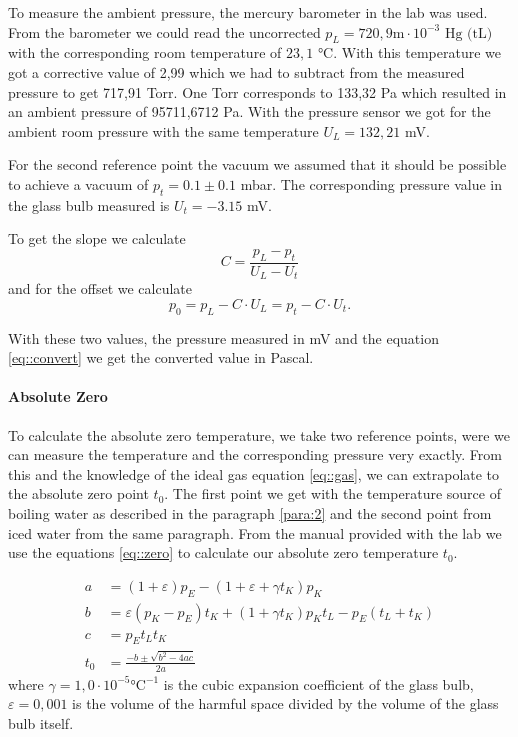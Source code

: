 To measure the ambient pressure, the mercury barometer in the lab was used.
From the barometer we could read the uncorrected $p_L = 720,9$$\si{\m} \cdot 10^{-3} \text{  Hg (tL)}$ with the corresponding room temperature of $23,1$ $\si{\degreeCelsius}$. 
With this temperature we got a corrective value of 2,99 which we had to subtract from the measured pressure to get 717,91 Torr.
One Torr corresponds to 133,32 Pa which resulted in an ambient pressure of 95711,6712 Pa.
With the pressure sensor we got for the ambient room pressure with the same temperature $U_L = 132,21$ \si{\milli\volt}.


For the second reference point the vacuum we assumed that it should be possible to achieve a vacuum of $p_t = 0.1\pm 0.1$ mbar. 
The corresponding pressure value in the glass bulb measured is $ U_t = -3.15$ \si{\milli\volt}.


To get the slope we calculate
\[
C= \frac{p_L -p_t}{U_L -U_t}
\]
and for the offset we calculate
\[
p_0= p_L-C\cdot U_L = p_t-C\cdot U_t.
\]

With these two values, the pressure measured in \si{\milli\volt} and the equation \ref{eq::convert} we get the converted value in Pascal.


\paragraph{Absolute Zero} To calculate the absolute zero temperature, we take two reference points, were we can measure the temperature and the corresponding pressure very exactly. 
From this and the knowledge of the ideal gas equation \ref{eq::gas}, we can extrapolate to the absolute zero point $t_0$.
The first point we get with the temperature source of boiling water as described in the paragraph \ref{para:2} and the second point from iced water from the same paragraph.
From the manual\cite{manual} provided with the lab we use the equations \ref{eq::zero} to calculate our absolute zero temperature $t_0$.

\begin{equation}
\begin{aligned}
a &=(1+\varepsilon) p_{E}-\left(1+\varepsilon+\gamma t_{K}\right) p_{K} \\
b &=\varepsilon\left(p_{K}-p_{E}\right) t_{K}+\left(1+\gamma t_{K}\right) p_{K} t_{L}-p_{E}\left(t_{L}+t_{K}\right) \\
c &=p_{E} t_{L} t_{K} \\
t_{0} &=\frac{-b \pm \sqrt{b^{2}-4 a c}}{2 a}
\end{aligned}
\label{eq::zero}
\end{equation}
where $\gamma = 1,0 \cdot 10^{-5} \si{\degreeCelsius}^{-1}$ is the cubic expansion coefficient of the glass bulb, $\varepsilon = 0,001$ is the volume of the harmful space divided by the volume of the glass bulb itself.






